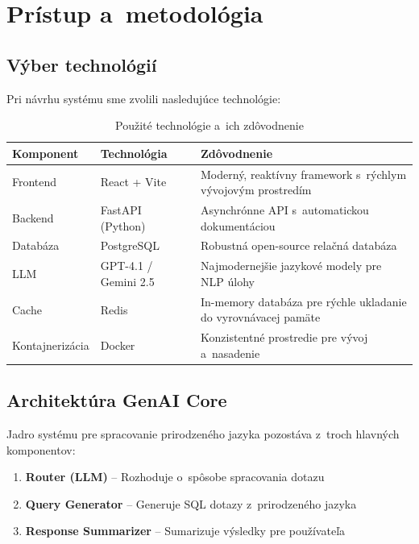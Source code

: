 \documentclass[a4paper, 12pt]{article}
\begin{document}
\clearpage

\section{Prístup a~metodológia}

\subsection{Výber technológií}

Pri návrhu systému sme zvolili nasledujúce technológie:

\begin{table}[H]
\centering
\begin{tabular}{llp{7cm}}
\toprule
\textbf{Komponent} & \textbf{Technológia} & \textbf{Zdôvodnenie} \\
\midrule
Frontend & React + Vite & Moderný, reaktívny framework s~rýchlym vývojovým prostredím \\
Backend & FastAPI (Python) & Asynchrónne API s~automatickou dokumentáciou \\
Databáza & PostgreSQL & Robustná open-source relačná databáza \\
LLM & GPT-4.1 / Gemini 2.5 & Najmodernejšie jazykové modely pre NLP úlohy \\
Cache & Redis & In-memory databáza pre rýchle ukladanie do vyrovnávacej pamäte \\
Kontajnerizácia & Docker & Konzistentné prostredie pre vývoj a~nasadenie \\
\bottomrule
\end{tabular}
\caption{Použité technológie a~ich zdôvodnenie}
\end{table}

\subsection{Architektúra GenAI Core}

Jadro systému pre spracovanie prirodzeného jazyka pozostáva z~troch hlavných komponentov:

\begin{enumerate}
    \item \textbf{Router (LLM)} -- Rozhoduje o~spôsobe spracovania dotazu
    \item \textbf{Query Generator} -- Generuje SQL dotazy z~prirodzeného jazyka
    \item \textbf{Response Summarizer} -- Sumarizuje výsledky pre používateľa
\end{enumerate}
\end{document}
